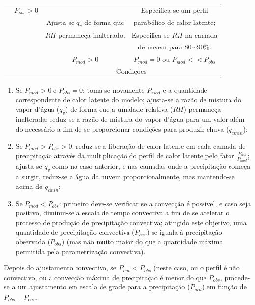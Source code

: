 \begin{table}[!hbp]
\begin{tabular}{|c|c|c|c|}
\begin{sideways}
\end{sideways} & $P_{obs}>0$&  & Especifica-se um perfil\tabularnewline
\begin{sideways}

\end{sideways} &  & Ajusta-se $q_{v}$ de forma que & parabólico de calor latente;\tabularnewline
\begin{sideways}

\end{sideways} &  & $RH$ permaneça inalterado. & Especifica-se $RH$ na camada\tabularnewline
\begin{sideways}

\end{sideways} &  &  & de nuvem para 80$\sim$90\%.\tabularnewline
\hline
\multicolumn{1}{c}{} &  & $P_{mod}>0$ & $P_{mod}=0$ ou $P_{mod}<<P_{obs}$\tabularnewline
\cline{3-4} 
\multicolumn{1}{c}{} &  & \multicolumn{2}{c|}{Condições}\tabularnewline
\cline{3-4} 
\end{tabular}
\end{table}

\begin{enumerate}
\item Se $P_{mod}>0$ e $P_{obs}=0$: toma-se novamente $P_{mod}$ e a quantidade correspondente de calor latente do modelo; ajusta-se a razão de mistura do vapor d'água ($q_{v}$) de forma que a umidade relativa ($RH$) permaneça inalterada; reduz-se a razão de mistura do vapor d'água para um valor além do necessário a fim de se proporcionar condições para produzir chuva ($q_{cmin}$);
\item Se $P_{mod}>P_{obs}>0$: reduz-se a liberação de calor latente em cada camada de precipitação através da multiplicação do perfil de calor latente pelo fator $\frac{P_{obs}}{P_{mod}}$; ajusta-se $q_{v}$ como no caso anterior, e nas camadas onde a precipitação começa a surgir, reduz-se a água da nuvem proporcionalmente, mas mantendo-se acima de $q_{cmin}$;
\item Se $P_{mod}<P_{obs}$: primeiro deve-se verificar se a convecção é possível, e caso seja positivo, diminui-se a escala de tempo convectiva a fim de se acelerar o processo de produção de precipitação convectiva; atingido este objetivo, uma quantidade de precipitação convectiva ($P_{cnv}$) se iguala à precipitação observada ($P_{obs}$) (mas não muito maior do que a quantidade máxima permitida pela parametrização convectiva).
\end{enumerate}

Depois do ajustamento convectivo, se $P_{cnv}<P_{obs}$ (neste caso, ou o perfil é não convectivo, ou a convecção máxima de precipitação é menor do que $P_{obs}$, procede-se a um ajustamento em escala de grade para a precipitação ($P_{grd}$) em função de $P_{obs}-P_{cnv}$.

